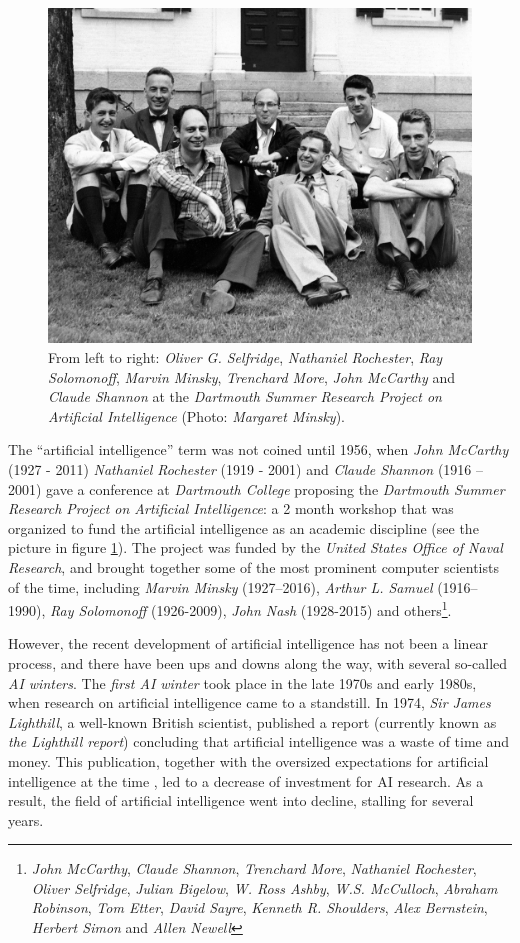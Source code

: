 \begin{figure}[h!]
	\centering
	\includegraphics[width=.6\textwidth]{introduction/images/dartmouth}
	\caption{From left to right: \textit{Oliver G. Selfridge}, \textit{Nathaniel Rochester}, \textit{Ray Solomonoff}, \textit{Marvin Minsky}, \textit{Trenchard More}, \textit{John McCarthy} and \textit{Claude Shannon} at the \textit{Dartmouth Summer Research Project on Artificial Intelligence} (Photo: \textit{Margaret Minsky}).}
	\label{fig:dartmouth_photo}
\end{figure}

The ``artificial intelligence'' term was not coined until 1956, when \textit{John McCarthy} (1927 - 2011) \textit{Nathaniel Rochester} (1919 - 2001) and \textit{Claude Shannon} (1916 – 2001) gave a conference at \textit{Dartmouth College} proposing the \textit{Dartmouth Summer Research Project on Artificial Intelligence}: a 2 month workshop that was organized to fund the artificial intelligence as an academic discipline (see the picture in figure \ref{fig:dartmouth_photo}). The project was funded by the \textit{United States Office of Naval Research}, and brought together some of the most prominent computer scientists of the time, including \textit{Marvin Minsky} (1927–2016), \textit{Arthur L. Samuel} (1916–1990), \textit{Ray Solomonoff} (1926-2009),  \textit{John Nash} (1928-2015) and others\footnote{\textit{John McCarthy}, \textit{Claude Shannon}, \textit{Trenchard More}, \textit{Nathaniel Rochester}, \textit{Oliver Selfridge}, \textit{Julian Bigelow}, \textit{W. Ross Ashby}, \textit{W.S. McCulloch}, \textit{Abraham Robinson}, \textit{Tom Etter},  \textit{David Sayre}, \textit{Kenneth R. Shoulders}, \textit{Alex Bernstein}, \textit{Herbert Simon} and \textit{Allen Newell}}.

However, the recent development of artificial intelligence has not been a linear process, and there have been ups and downs along the way, with several so-called \textit{AI winters}. The \textit{first AI winter} took place in the late 1970s and early 1980s, when research on artificial intelligence came to a standstill. In 1974, \textit{Sir James Lighthill}, a well-known British scientist, published a report \autocite{lighthillReport} (currently known as \textit{the Lighthill report}) concluding that artificial intelligence was a waste of time and money. This publication, together with the oversized expectations for artificial intelligence at the time \autocite{russellNorvig}, led to a decrease of investment for AI research. As a result, the field of artificial intelligence went into decline, stalling for several years.

